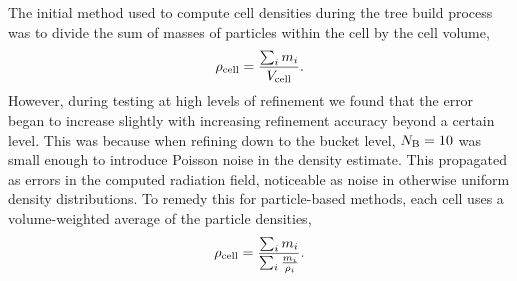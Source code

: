 \documentclass[fleq,usenatbib]{mnras}
\begin{document}
{The initial method used to compute cell densities during the tree build 
process was to divide the sum of masses of particles within the cell by the 
cell volume, 
\begin{equation}
\rho_{\rm cell} = \frac{\sum_i m_i}{V_{\rm cell}}.
\end{equation}
However, during testing at high levels of refinement we found that the error 
began to increase slightly with increasing refinement accuracy beyond a 
certain level. This was because when refining down to the bucket level, 
$N_{\rm B}=10$ was small enough to introduce Poisson noise in the 
density estimate.  This propagated as errors in the computed radiation field, 
noticeable as noise in otherwise uniform density distributions. To remedy this 
for particle-based methods, each cell uses a volume-weighted average of the particle  
densities,
\begin{equation}
\rho_{\rm cell} = \frac{\sum_i m_i}{\sum_i{\frac{m_i}{\rho_i}}}.
\end{equation}

}
\end{document}
